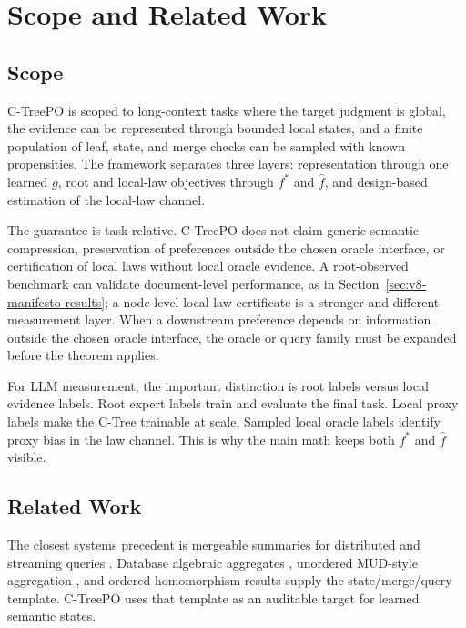 \section{Scope and Related Work}\label{sec:v8-scope-related}

\subsection{Scope}

C-TreePO is scoped to long-context tasks where the target judgment is global,
the evidence can be represented through bounded local states, and a finite
population of leaf, state, and merge checks can be sampled with known
propensities. The framework separates three layers: representation through one
learned \(g\), root and local-law objectives through \(f^\ast\) and
\(\widehat f\), and design-based estimation of the local-law channel.

The guarantee is task-relative. C-TreePO does not claim generic semantic
compression, preservation of preferences outside the chosen oracle interface,
or certification of local laws without local oracle evidence. A root-observed
benchmark can validate document-level performance, as in
Section~\ref{sec:v8-manifesto-results}; a node-level local-law certificate is a
stronger and different measurement layer. When a downstream preference depends
on information outside the chosen oracle interface, the oracle or query family
must be expanded before the theorem applies.

For LLM measurement, the important distinction is root labels versus local
evidence labels. Root expert labels train and evaluate the final task. Local
proxy labels make the C-Tree trainable at scale. Sampled local oracle labels
identify proxy bias in the law channel. This is why the main math keeps both
\(f^\ast\) and \(\widehat f\) visible.

\subsection{Related Work}

The closest systems precedent is mergeable summaries for distributed and
streaming queries \citep{Agarwal2013MergeableTODS}. Database algebraic
aggregates \citep{GrayEtAl1997DataCube}, unordered MUD-style aggregation
\citep{FeldmanEtAl2008MUD}, and ordered homomorphism results
\citep{Gibbons1996ThirdHomomorphism} supply the state/merge/query template.
C-TreePO uses that template as an auditable target for learned semantic states.

